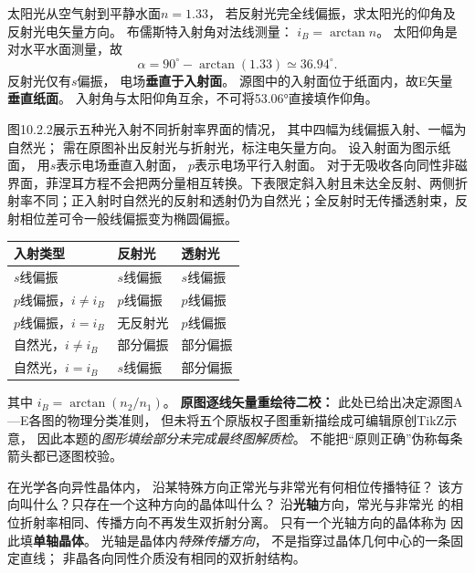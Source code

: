 \problemtext 太阳光从空气射到平静水面$n=1.33$，
若反射光完全线偏振，求太阳光的仰角及反射光电矢量方向。
\workings
布儒斯特入射角对法线测量：
$i_B=\arctan n$。
太阳仰角是对水平水面测量，故
\[
\boxed{\alpha=90^\circ-\arctan(1.33)
\simeq36.94^\circ}.
\]
反射光仅有$s$偏振，
电场\textbf{垂直于入射面}。
源图中的入射面位于纸面内，故E矢量
\textbf{垂直纸面}。
\crosscheck 入射角与太阳仰角互余，不可将53.06°直接填作仰角。

\problemtext 图10.2.2展示五种光入射不同折射率界面的情况，
其中四幅为线偏振入射、一幅为自然光；
需在原图补出反射光与折射光，标注电矢量方向。
\workings
设入射面为图示纸面，
用$s$表示电场垂直入射面，
$p$表示电场平行入射面。
对于无吸收各向同性非磁界面，菲涅耳方程不会把两分量相互转换。下表限定斜入射且未达全反射、两侧折射率不同；正入射时自然光的反射和透射仍为自然光；全反射时无传播透射束，反射相位差可令一般线偏振变为椭圆偏振。
\begin{center}
\begin{tabular}{lll}
\hline
入射类型 & 反射光 & 透射光\\ \hline
$s$线偏振 & $s$线偏振 & $s$线偏振\\
$p$线偏振，$i\ne i_B$ & $p$线偏振 & $p$线偏振\\
$p$线偏振，$i=i_B$ & 无反射光 & $p$线偏振\\
自然光，$i\ne i_B$ & 部分偏振 & 部分偏振\\
自然光，$i=i_B$ & $s$线偏振 & 部分偏振\\
\hline
\end{tabular}
\end{center}
其中
$\boxed{i_B=\arctan(n_2/n_1)}$。
\crosscheck \textbf{原图逐线矢量重绘待二校：}
此处已给出决定源图A—E各图的物理分类准则，
但未将五个原版权子图重新描绘成可编辑原创TikZ示意，
因此本题的\emph{图形填绘部分未完成最终图解质检}。
不能把“原则正确”伪称每条箭头都已逐图校验。

\problemtext 在光学各向异性晶体内，
沿某特殊方向正常光与非常光有何相位传播特征？
该方向叫什么？只存在一个这种方向的晶体叫什么？
\workings
沿\textbf{光轴}方向，常光与非常光
的相位折射率相同、传播方向不再发生双折射分离。
只有一个光轴方向的晶体称为
因此填\textbf{单轴晶体}。
\crosscheck 光轴是晶体内\emph{特殊传播方向}，
不是指穿过晶体几何中心的一条固定直线；
非晶各向同性介质没有相同的双折射结构。

